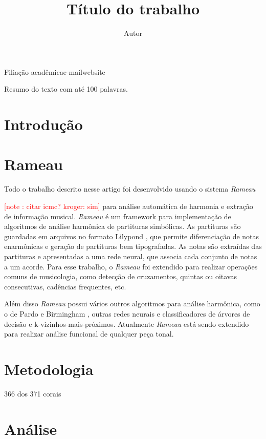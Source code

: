 \documentclass{article}
\newcounter{notecounter}
\newcommand{\note}[1]{
  \addtocounter{notecounter}{1}
  \textcolor{red}{[note \arabic{notecounter}: #1]}
}
\newcommand{\rameau}{\textit{Rameau}}
\begin{document}
\graphicspath{{figs/}}

\title{Título do trabalho}
\author{Autor}{Filiação acadêmica}{e-mail}{website}

\begin{sumario}
  Resumo do texto com até 100 palavras.  
\end{sumario}


\section{Introdução}
\label{sec:introducao}


\section{Rameau}
\label{sec:rameau}

Todo o trabalho descrito nesse artigo foi desenvolvido usando o
sistema \rameau{} \note{citar icmc? kroger: sim} para análise
automática de harmonia e extração de informação musical. \rameau{} é
um framework para implementação de algoritmos de análise harmônica de
partituras simbólicas. As partituras são guardadas em arquivos no
formato Lilypond \cite{nienhuys.ea08:lilypond}, que permite
diferenciação de notas enarmônicas e geração de partituras bem
tipografadas. As notas são extraídas das partituras e apresentadas a
uma rede neural, que associa cada conjunto de notas a um acorde. Para
esse trabalho, o \rameau{} foi extendido para realizar operações
comuns de musicologia, como detecção de cruzamentos, quintas ou
oitavas consecutivas, cadências frequentes, etc.

Além disso \rameau{}  possui vários outros algoritmos para análise
harmônica, como o de Pardo e Birmingham \cite{pardo.ea00:automated},
outras redes neurais e classificadores de árvores de decisão e
k-vizinhos-mais-próximos. Atualmente \rameau{}  está sendo extendido para
realizar análise funcional de qualquer peça tonal.

\section{Metodologia}
\label{sec:metodologia}

366 dos 371 corais

\section{Análise}
\label{sec:analise}
\end{document}
